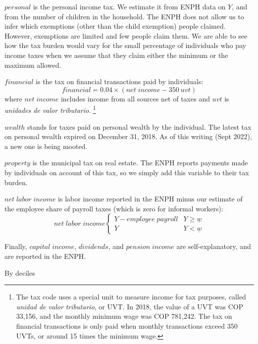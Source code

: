 \documentclass[12pt]{article}
\begin{document}
$personal$ is the personal income tax.
We estimate it from ENPH data on $Y$,
and from the number of children in the household.
The ENPH does not allow us to infer which exemptions
(other than the child exemption) people claimed.
However, exemptions are limited and few people claim them.
We are able to see how the tax burden would vary
for the small percentage of individuals who pay income taxes
when we assume that they claim either the minimum or the maximum allowed.

$financial$ is the tax on financial transactions paid by individuals:
\begin{equation}
  financial=0.04 \times (net \;income -350\ uvt)
\end{equation}
where $net \;income$ includes income from all sources net of taxes
and $uvt$ is \textit{unidades de valor tributario}.
\footnote{The tax code uses a special unit to measure income for tax purposes,
called \textit{unidad de valor tributario}, or UVT.
In 2018, the value of a UVT was COP 33,156,
and the monthly minimum wage was COP 781,242.
The tax on financial transactions is only paid
when monthly transactions exceed 350 UVTs,
or around 15 times the minimum wage.}

$wealth$ stands for taxes paid on personal wealth by the individual.
The latest tax on personal wealth expired on December 31, 2018.
As of this writing (Sept 2022), a new one is being mooted.

$property$ is the municipal tax on real estate.
The ENPH reports payments made by individuals on account of this tax,
so we simply add this variable to their tax burden.

$net \; labor \;income$ is labor income reported in the ENPH
minus our estimate of the employee share of payroll taxes
(which is zero for informal workers):
\begin{equation}
net \; labor \;income
  \begin{cases}
	Y - employee \; payroll& Y \geq \underline{w} \\
	Y &  Y < \underline{w}
  \end{cases}
\end{equation}

Finally, $capital \; income$, $dividends$, and $pension \; income$
are self-explanatory, and are reported in the ENPH.

\iffalse
[[SOMEONE:
    What does this next passage mean?
    It looks like it got mangled.
    --jbb]]
\fi

By deciles
\end{document}
